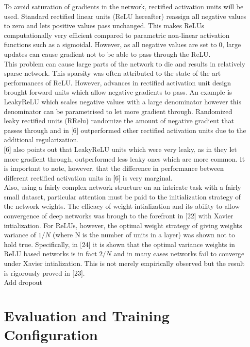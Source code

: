 \documentclass{article}
\begin{document}
To avoid saturation of gradients in the network, rectified activation units will be used. Standard rectified linear units (ReLU hereafter) reassign all negative values to zero and lets positive values pass unchanged. This makes ReLUs computationally very efficient compared to parametric non-linear activation functions such as a sigmoidal. However, as all negative values are set to 0, large updates can cause gradient not to be able to pass through the ReLU.\\

This problem can cause large parts of the network to die and results in relatively sparse network. This sparsity was often attributed to the state-of-the-art performances of ReLU. However, advances in rectified activation unit design brought forward units which allow negative gradients to pass. An example is LeakyReLU which scales negative values with a large denominator however this denominator can be parametrised to let more gradient through. Randomized leaky rectified units (RRelu) randomize the amount of negative gradient that passes through and in [6] outperformed other rectified activation units due to the additional regularization.\\

[6] also points out that LeakyReLU units which were very leaky, as in they let more gradient through, outperformed less leaky ones which are more common. It is important to note, however, that the difference in performance between different rectified activation units in [6] is very marginal.\\

Also, using a fairly complex network structure on an intricate task with a fairly small dataset, particular attention must be paid to the initialization strategy of the network weights. The efficacy of weight intialization and its ability to allow convergence of deep networks was brough to the forefront in [22] with Xavier intialization. For ReLUs, however, the optimal weight strategy of giving weights variance of $1/N$ (where N is the number of units in a layer) was shown not to hold true. Specifically, in [24] it is shown that the optimal variance weights in ReLU based networks is in fact $2/N$ and in many cases networks fail to converge under Xavier intialization. This is not merely empirically observed but the result is rigorously proved in [23].\\

Add dropout

\section{Evaluation and Training Configuration}
\end{document}
